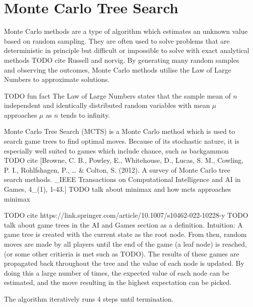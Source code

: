 \section{Monte Carlo Tree Search}
Monte Carlo methods are a type of algorithm which estimates an unknown value based on random sampling. They are often used to solve problems that are deterministic in principle but difficult or impossible to solve with exact analytical methods TODO cite Russell and norvig. By generating many random samples and observing the outcomes, Monte Carlo methods utilise the Law of Large Numbers to approximate solutions.

TODO fun fact
The Law of Large Numbers states that the sample mean of $n$ independent and identically distributed random variables with mean $\mu$ approaches $\mu$ as $n$ tends to infinity.

Monte Carlo Tree Search (MCTS) is a Monte Carlo method which is used to search game trees to find optimal moves. Because of its stochastic nature, it is especially well suited to games which include chance, such as backgammon TODO cite [Browne, C. B., Powley, E., Whitehouse, D., Lucas, S. M., Cowling, P. I., Rohlfshagen, P., … \& Colton, S. (2012). A survey of Monte Carlo tree search methods. \_IEEE Transactions on Computational Intelligence and AI in Games, 4\_(1), 1-43.] 
TODO talk about minimax and how mcts approaches minimax

TODO cite https://link.springer.com/article/10.1007/s10462-022-10228-y
TODO talk about game trees in the AI and Games section as a definition. 
Intuition: A game tree is created with the current state as the root node. From then, random moves are made by all players until the end of the game (a leaf node) is reached, (or some other critieria is met such as TODO). The results of these games are propagated back throughout the tree and the value of each node is updated. By doing this a large number of times, the expected value of each node can be estimated, and the move resulting in the highest expectation can be picked.

The algorithm iteratively runs 4 steps until termination. 

